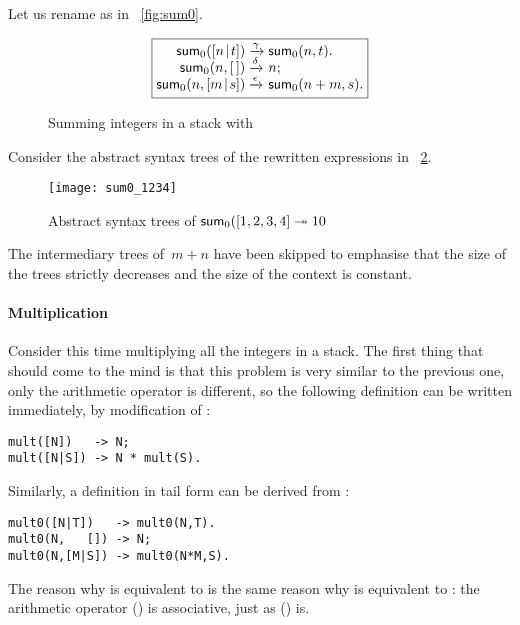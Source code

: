 Let us rename  as  in
\fig~\vref{fig:sum0}.
\begin{figure}
\begin{equation*}
\boxed{%
\begin{array}{@{}r@{\;}l@{\;}l@{}}
\fun{sum}_0(\cons{n}{t}) & \xrightarrow{\smash{\gamma}}
                         & \fun{sum}_0(n,t).\\
      \fun{sum}_0(n,\el) & \xrightarrow{\smash{\delta}} & n;\\
\fun{sum}_0(n,\cons{m}{s}) & \xrightarrow{\smash{\epsilon}}
                           & \fun{sum}_0(n+m,s).
\end{array}}
\end{equation*}
\caption{Summing integers in a stack with }
\label{fig:sum0}
\end{figure}
Consider the abstract syntax trees of the rewritten
expressions in \fig~\ref{fig:sum0_1234}.
\begin{figure}
\centering
\texttt{[image: sum0\_1234]}
\caption{Abstract syntax trees of \(\textsf{sum}_0([1,2,3,4]
  \twoheadrightarrow 10\)}
\label{fig:sum0_1234}
\end{figure}
The intermediary trees of~\(m+n\) have been skipped to emphasise that
the size of the trees strictly decreases and the size of the context
is constant.

\paragraph{Multiplication}

Consider this time multiplying all the integers in a stack. The first
thing that should come to the mind is that this problem is very
similar to the previous one, only the arithmetic operator is
different, so the following definition can be written immediately, by
modification of :
\begin{verbatim}
mult([N])   -> N;
mult([N|S]) -> N * mult(S).
\end{verbatim}
Similarly, a definition in tail form can be derived from
:
\begin{verbatim}
mult0([N|T])   -> mult0(N,T).
mult0(N,   []) -> N;
mult0(N,[M|S]) -> mult0(N*M,S).
\end{verbatim}
The reason why  is equivalent to  is
the same reason why  is equivalent to :
the arithmetic operator (\erlcode{*}) is associative, just as
(\erlcode{+}) is.

